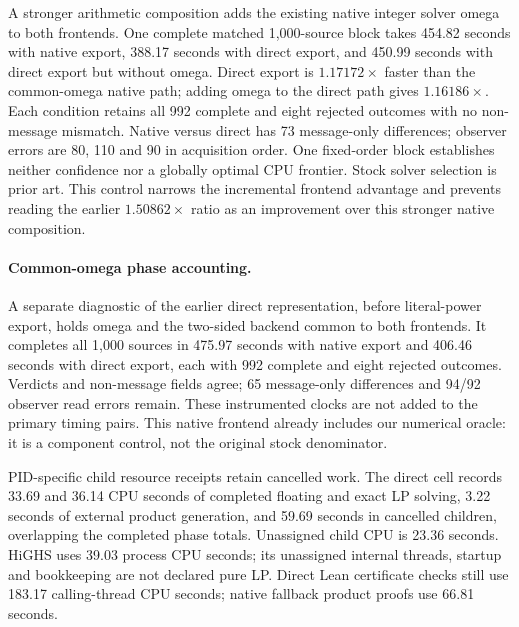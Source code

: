 \documentclass[10pt,twocolumn]{article}
\begin{document}
A stronger arithmetic composition adds the existing native integer solver
omega to both frontends. One complete matched 1,000-source block takes
454.82 seconds with native export, 388.17 seconds with direct export, and
450.99 seconds with direct export but without omega. Direct export is
$1.17172\times$ faster than the common-omega native path; adding omega to
the direct path gives $1.16186\times$. Each condition retains all 992 complete
and eight rejected outcomes with no non-message mismatch. Native versus
direct has 73 message-only differences; observer errors are 80, 110 and 90
in acquisition order. One fixed-order block establishes neither confidence
nor a globally optimal CPU frontier. Stock solver selection is prior art.
This control narrows the incremental frontend advantage and prevents reading
the earlier $1.50862\times$ ratio as an improvement over this stronger native
composition.


\paragraph{Common-omega phase accounting.}
A separate diagnostic of the earlier direct representation, before literal-power
export, holds omega and the two-sided backend common to both frontends. It completes all 1,000 sources in 475.97 seconds with native export
and 406.46 seconds with direct export, each with 992 complete and eight rejected
outcomes. Verdicts and non-message fields agree; 65 message-only differences
and 94/92 observer read errors remain. These instrumented clocks are not added
to the primary timing pairs. This native frontend already includes our
numerical oracle: it is a component control, not the original stock denominator.

PID-specific child resource receipts retain cancelled work. The direct cell
records 33.69 and 36.14 CPU seconds of completed floating and exact LP solving,
3.22 seconds of external product generation, and 59.69 seconds in cancelled
children, overlapping the completed phase totals. Unassigned child CPU is
23.36 seconds. HiGHS uses 39.03 process CPU seconds; its unassigned internal
threads, startup and bookkeeping are not declared pure LP.
Direct Lean certificate checks still use 183.17 calling-thread CPU seconds;
native fallback product proofs use 66.81 seconds.
\end{document}
